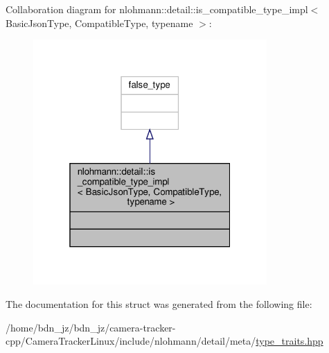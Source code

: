 Collaboration diagram for nlohmann\+:\+:detail\+:\+:is\+\_\+compatible\+\_\+type\+\_\+impl$<$ Basic\+Json\+Type, Compatible\+Type, typename $>$\+:\nopagebreak
\begin{figure}[H]
\begin{center}
\leavevmode
\includegraphics[width=253pt]{structnlohmann_1_1detail_1_1is__compatible__type__impl__coll__graph}
\end{center}
\end{figure}


The documentation for this struct was generated from the following file\+:\begin{DoxyCompactItemize}
\item 
/home/bdn\+\_\+jz/bdn\+\_\+jz/camera-\/tracker-\/cpp/\+Camera\+Tracker\+Linux/include/nlohmann/detail/meta/\hyperlink{type__traits_8hpp}{type\+\_\+traits.\+hpp}\end{DoxyCompactItemize}
